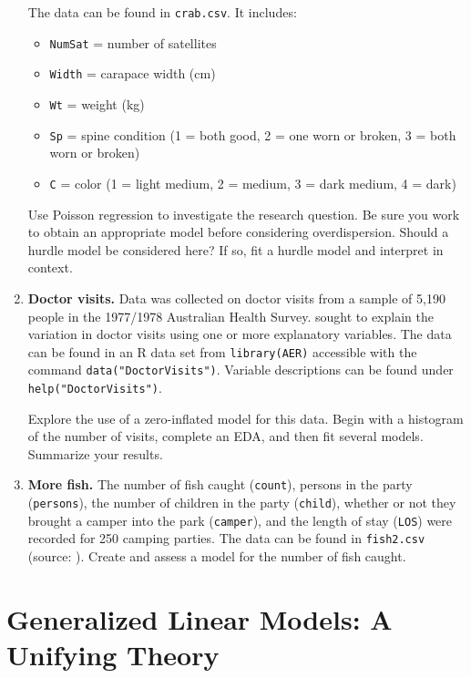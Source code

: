 \documentclass[
]{krantz}
\providecommand{\tightlist}{%
  \setlength{\itemsep}{0pt}\setlength{\parskip}{0pt}}
\begin{document}
\begin{enumerate}
  The data can be found in \texttt{crab.csv}. It includes:

  \begin{itemize}
  \tightlist
  \item
    \texttt{NumSat} = number of satellites
  \item
    \texttt{Width} = carapace width (cm)
  \item
    \texttt{Wt} = weight (kg)
  \item
    \texttt{Sp} = spine condition (1 = both good, 2 = one worn or broken, 3 = both worn or broken)
  \item
    \texttt{C} = color (1 = light medium, 2 = medium, 3 = dark medium, 4 = dark)
  \end{itemize}

  Use Poisson regression to investigate the research question. Be sure you work to obtain an appropriate model before considering overdispersion. Should a hurdle model be considered here? If so, fit a hurdle model and interpret in context.
\item
  \textbf{Doctor visits.} Data was collected on doctor visits from a sample of 5,190 people in the 1977/1978 Australian Health Survey. \citet{Cameron1986} sought to explain the variation in doctor visits using one or more explanatory variables. The data can be found in an R data set from \texttt{library(AER)} accessible with the command \texttt{data("DoctorVisits")}. Variable descriptions can be found under \texttt{help("DoctorVisits")}.

  Explore the use of a zero-inflated model for this data. Begin with a histogram of the number of visits, complete an EDA, and then fit several models. Summarize your results.
\item
  \textbf{More fish.} The number of fish caught (\texttt{count}), persons in the party (\texttt{persons}), the number of children in the party (\texttt{child}), whether or not they brought a camper into the park (\texttt{camper}), and the length of stay (\texttt{LOS}) were recorded for 250 camping parties. The data can be found in \texttt{fish2.csv} (source: \citet{idre2018}). Create and assess a model for the number of fish caught.
\end{enumerate}

\hypertarget{ch-glms}{%
\chapter{Generalized Linear Models: A Unifying Theory}\label{ch-glms}}
\end{document}
